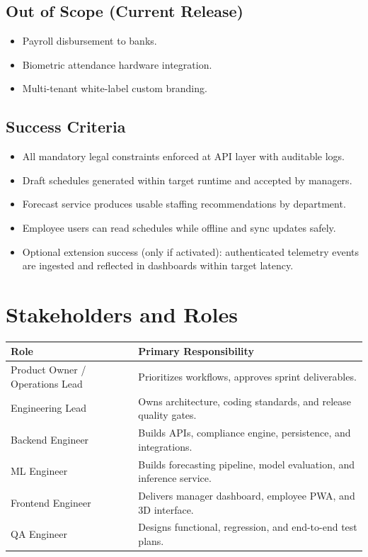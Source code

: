 \documentclass[11pt,a4paper]{article}
\newcommand{\thead}[1]{\textcolor{HeaderText}{\textbf{#1}}}
\begin{document}
\subsection{Out of Scope (Current Release)}
\begin{itemize}
  \item Payroll disbursement to banks.
  \item Biometric attendance hardware integration.
  \item Multi-tenant white-label custom branding.
\end{itemize}

\subsection{Success Criteria}
\begin{itemize}
  \item All mandatory legal constraints enforced at API layer with auditable logs.
  \item Draft schedules generated within target runtime and accepted by managers.
  \item Forecast service produces usable staffing recommendations by department.
  \item Employee users can read schedules while offline and sync updates safely.
  \item Optional extension success (only if activated): authenticated telemetry events are ingested and reflected in dashboards within target latency.
\end{itemize}

\section{Stakeholders and Roles}
\begin{tabularx}{\textwidth}{P{0.28\textwidth}Y}
\toprule
{}
\thead{Role} & \thead{Primary Responsibility} \\
\midrule
Product Owner / Operations Lead & Prioritizes workflows, approves sprint deliverables. \\
Engineering Lead & Owns architecture, coding standards, and release quality gates. \\
Backend Engineer & Builds APIs, compliance engine, persistence, and integrations. \\
ML Engineer & Builds forecasting pipeline, model evaluation, and inference service. \\
Frontend Engineer & Delivers manager dashboard, employee PWA, and 3D interface. \\
QA Engineer & Designs functional, regression, and end-to-end test plans. \\
\bottomrule
\end{tabularx}
\end{document}
